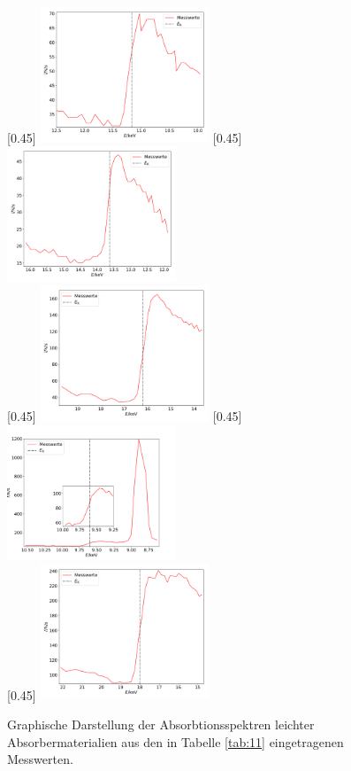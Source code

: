 \begin{figure}[h! p]
  \centering
  [0.45\textwidth]{
  \includegraphics[width=0.45\textwidth]{germanium.pdf}
  }
  [0.45\textwidth]{
  \includegraphics[width=0.45\textwidth]{brom.pdf}
  }\\
  [0.45\textwidth]{
  \includegraphics[width=0.45\textwidth]{strontium.pdf}
  }
  [0.45\textwidth]{
  \includegraphics[width=0.45\textwidth]{zink.pdf}
  }\\
  [0.45\textwidth]{
  \includegraphics[width=0.45\textwidth]{zirkonium.pdf}
  }
  \caption{Graphische Darstellung der Absorbtionsspektren leichter Absorbermaterialien
  aus den in Tabelle \ref{tab:11} eingetragenen Messwerten.}
\end{figure}
